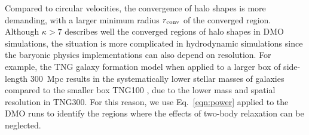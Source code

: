 \documentclass[fleqn,usenatbib]{mnras}
\begin{document}
Compared to circular velocities, the convergence of halo shapes is more demanding, with a larger minimum radius $r_{\rm conv}$ of the converged region.
Although $\kappa >7$ describes well the converged regions of halo shapes in DMO simulations, the situation is more complicated in hydrodynamic simulations since the baryonic physics implementations can also depend on resolution.
For example, the TNG galaxy formation model when applied to a larger box of side-length 300~Mpc results in the systematically lower stellar masses of galaxies compared to the smaller box TNG100 \citep{Pillepich18v475}, due to the lower mass and spatial resolution in TNG300.
For this reason, we use Eq.~\ref{eqn:power} applied to the DMO runs to identify the regions where the effects of two-body relaxation can be neglected.
\end{document}
